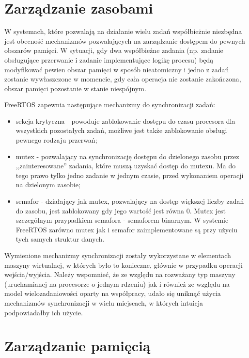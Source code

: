 \section{Zarządzanie zasobami}
\label{sec:rtosZasoby}

W systemach, które pozwalają na działanie wielu zadań współbieżnie niezbędna jest obecność mechanizmów pozwalających na 
zarządzanie dostępem do pewnych obszarów pamięci. W sytuacji, gdy dwa współbieżne zadania (np. zadanie obsługujące przerwanie i 
zadanie implementujące logikę procesu) będą modyfikować pewien obszar pamięci w sposób nieatomiczny i jedno z zadań zostanie wywłaszczone w momencie, gdy cała operacja nie zostanie zakończona, obszar pamięci pozostanie w stanie niespójnym.

FreeRTOS zapewnia następujące mechanizmy do synchronizacji zadań:
\begin{itemize}
\item sekcja krytyczna - powoduje zablokowanie dostępu do czasu procesora dla wszystkich pozostałych zadań, możliwe jest także zablokowanie obsługi pewnego rodzaju przerwań;
\item mutex - pozwalający na synchronizację dostępu do dzielonego zasobu przez ,,zainteresowane'' zadania, które muszą uzyskać dostęp do mutexu. Ma do tego prawo tylko jedno zadanie w jednym czasie, przed wykonaniem operacji na dzielonym zasobie;
\item semafor - działający jak mutex, pozwalający na dostęp większej liczby zadań do zasobu, jest zablokowany gdy jego wartość jest równa 0. Mutex jest szczególnym przypadkiem semafora - semaforem binarnym. W systemie FreeRTOS zarówno mutex jak i semafor zaimplementowane są przy użyciu tych samych struktur danych.
\end{itemize}

Wymienione mechanizmy synchronizacji zostały wykorzystane w elementach maszyny wirtualnej, w których było to konieczne, głównie w przypadku operacji wejścia/wyjścia.
Należy wspomnieć, że ze względu na rozważany typ maszyny (uruchamianej na procesorze o jednym rdzeniu) jak i również ze względu na model wielozadaniowości oparty na współpracy, udało się uniknąć użycia mechanizmów synchronizacji w wielu miejscach, w których intuicja podpowiadałby ich użycie.

\section{Zarządzanie pamięcią}
\label{sec:rtosPamiec}


